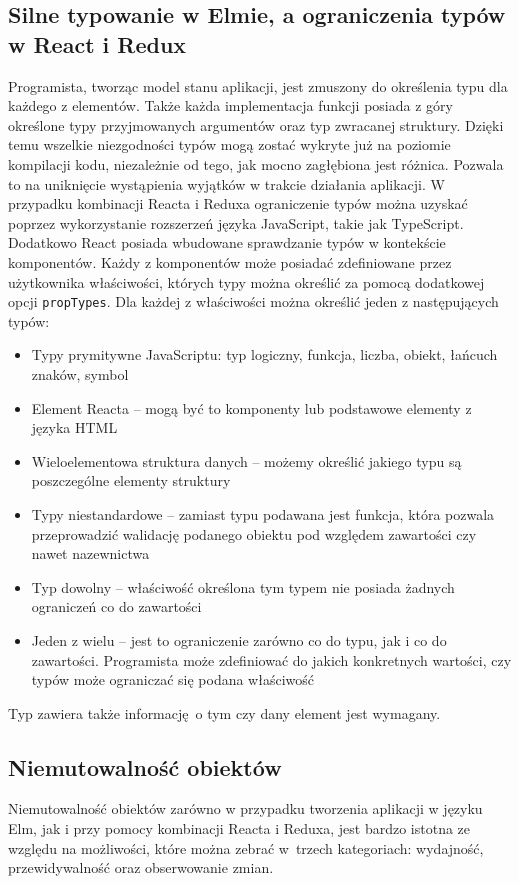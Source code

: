 \subsection{Silne typowanie w Elmie, a ograniczenia typów w React i Redux}
Programista, tworząc model stanu aplikacji, jest zmuszony do określenia typu dla każdego z elementów. Także każda implementacja funkcji posiada z góry określone typy przyjmowanych argumentów oraz typ zwracanej struktury. Dzięki temu wszelkie niezgodności typów mogą zostać wykryte już na poziomie kompilacji kodu, niezależnie od tego, jak mocno zagłębiona jest różnica. Pozwala to na uniknięcie wystąpienia wyjątków w trakcie działania aplikacji. W przypadku kombinacji Reacta i Reduxa ograniczenie typów można uzyskać poprzez wykorzystanie rozszerzeń języka JavaScript, takie jak TypeScript. Dodatkowo React posiada wbudowane sprawdzanie typów w kontekście komponentów. Każdy z komponentów może posiadać zdefiniowane przez użytkownika właściwości, których typy można określić za pomocą dodatkowej opcji \lstinline{propTypes}. Dla każdej z właściwości można określić jeden z następujących typów:
\begin{itemize}
	\item Typy prymitywne JavaScriptu: typ logiczny, funkcja, liczba, obiekt, łańcuch znaków, symbol
	\item Element Reacta -- mogą być to komponenty lub podstawowe elementy z języka HTML
	\item Wieloelementowa struktura danych -- możemy określić jakiego typu są poszczególne elementy struktury
	\item Typy niestandardowe -- zamiast typu podawana jest funkcja, która pozwala przeprowadzić walidację podanego obiektu pod względem zawartości czy nawet nazewnictwa
	\item Typ dowolny -- właściwość określona tym typem nie posiada żadnych ograniczeń co do zawartości
	\item Jeden z wielu -- jest to ograniczenie zarówno co do typu, jak i co do zawartości. Programista może zdefiniować do jakich konkretnych wartości, czy typów może ograniczać się podana właściwość
\end{itemize}
Typ zawiera także informację o tym czy dany element jest wymagany.

\subsection{Niemutowalność obiektów}
Niemutowalność obiektów zarówno w przypadku tworzenia aplikacji w języku Elm, jak i przy pomocy kombinacji Reacta i Reduxa, jest bardzo istotna ze względu na możliwości, które można zebrać w~trzech kategoriach: wydajność, przewidywalność oraz obserwowanie zmian. 

